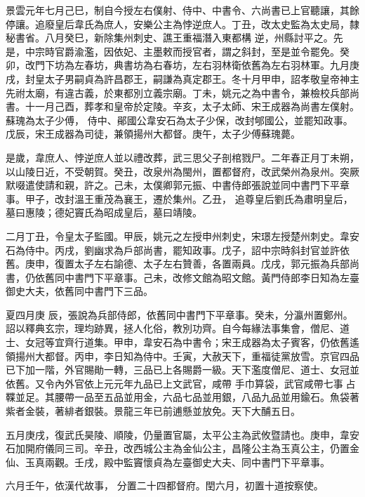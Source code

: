 \begin{pinyinscope}
 景雲元年七月己巳，制自今授左右僕射、侍中、中書令、六尚書已上官聽讓，其餘停讓。追廢皇后韋氏為庶人，安樂公主為悖逆庶人。丁丑，改太史監為太史局，隸秘書省。八月癸巳，新除集州刺史、譙王重福潛入東都構
 逆，州縣討平之。先是，中宗時官爵渝濫，因依妃、主墨敕而授官者，謂之斜封，至是並令罷免。癸卯，改門下坊為左春坊，典書坊為右春坊，左右羽林衛依舊為左右羽林軍。九月庚戌，封皇太子男嗣貞為許昌郡王，嗣謙為真定郡王。冬十月甲申，詔孝敬皇帝神主先祔太廟，有違古義，於東都別立義宗廟。丁未，姚元之為中書令，兼檢校兵部尚書。十一月己酉，葬孝和皇帝於定陵。辛亥，太子太師、宋王成器為尚書左僕射。蘇瑰為太子少傅，
 侍中、鄖國公韋安石為太子少保，改封郇國公，並罷知政事。戊辰，宋王成器為司徒，兼領揚州大都督。庚午，太子少傅蘇瑰薨。



 是歲，韋庶人、悖逆庶人並以禮改葬，武三思父子剖棺戮尸。二年春正月丁未朔，以山陵日近，不受朝賀。癸丑，改泉州為閩州，置都督府，改武榮州為泉州。突厥默啜遣使請和親，許之。己未，太僕卿郭元振、中書侍郎張說並同中書門下平章事。甲子，改封溫王重茂為襄王，遷於集州。乙丑，
 追尊皇后劉氏為肅明皇后，墓曰惠陵；德妃竇氏為昭成皇后，墓曰靖陵。



 二月丁丑，令皇太子監國。甲辰，姚元之左授申州刺史，宋璟左授楚州刺史。韋安石為侍中。丙戌，劉幽求為戶部尚書，罷知政事。戊子，詔中宗時斜封官並許依舊。庚申，復置太子左右諭德、太子左右贊善，各置兩員。戊戌，郭元振為兵部尚書，仍依舊同中書門下平章事。己未，改修文館為昭文館。黃門侍郎李日知為左臺御史大夫，依舊同中書門下三品。



 夏四月庚
 辰，張說為兵部侍郎，依舊同中書門下平章事。癸未，分瀛州置鄭州。詔以釋典玄宗，理均跡異，拯人化俗，教別功齊。自今每緣法事集會，僧尼、道士、女冠等宜齊行道集。甲申，韋安石為中書令；宋王成器為太子賓客，仍依舊遙領揚州大都督。丙申，李日知為侍中。壬寅，大赦天下，重福徒黨放雪。京官四品已下加一階，外官賜勛一轉，三品已上各賜爵一級。天下濫度僧尼、道士、女冠並依舊。又令內外官依上元元年九品已上文武官，咸帶
 手巾算袋，武官咸帶七事占鞢並足。其腰帶一品至五品並用金，六品七品並用銀，八品九品並用鍮石。魚袋著紫者金裝，著緋者銀裝。景龍三年已前逋懸並放免。天下大酺五日。



 五月庚戌，復武氏昊陵、順陵，仍量置官屬，太平公主為武攸暨請也。庚申，韋安石加開府儀同三司。辛丑，改西城公主為金仙公主，昌隆公主為玉真公主，仍置金仙、玉真兩觀。壬戌，殿中監竇懷貞為左臺御史大夫、同中書門下平章事。



 六月壬午，依漢代故事，
 分置二十四都督府。閏六月，初置十道按察使。




\end{pinyinscope}
